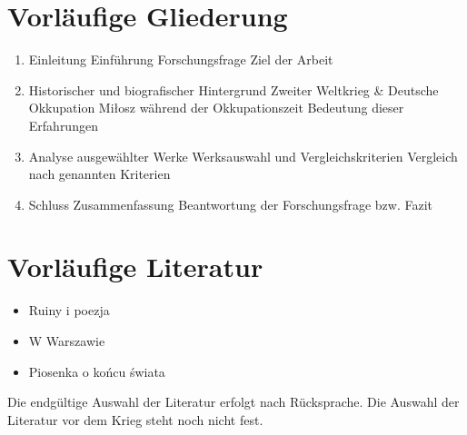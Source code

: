 \documentclass[12pt,a4paper]{article}
\begin{document}
\section{Vorläufige Gliederung}

\begin{enumerate}
    \item Einleitung
    \iitem Einführung
    \iitem Forschungsfrage
    \iitem Ziel der Arbeit 
    \item Historischer und biografischer Hintergrund
    \iitem Zweiter Weltkrieg \& Deutsche Okkupation
    \iitem Miłosz während der Okkupationszeit
    \iitem Bedeutung dieser Erfahrungen
    \item Analyse ausgewählter Werke
    \iitem  Werksauswahl und Vergleichskriterien
    \iitem Vergleich nach genannten Kriterien
    \item Schluss
    \iitem Zusammenfassung
    \iitem Beantwortung der Forschungsfrage bzw. Fazit
\end{enumerate}

\section{Vorläufige Literatur}
\begin{itshape}
\begin{itemize}
    \item Ruiny i poezja
    \item W Warszawie
    \item Piosenka o końcu świata
\end{itemize}
\end{itshape} 
Die endgültige Auswahl der Literatur erfolgt nach Rücksprache. Die Auswahl der Literatur vor dem Krieg steht noch nicht fest.
\end{document}
